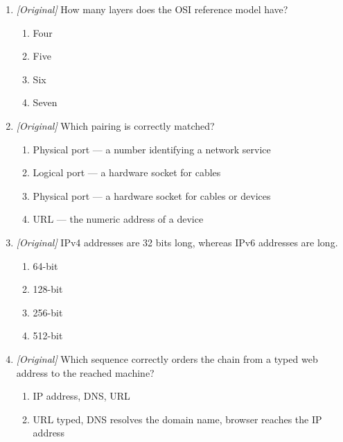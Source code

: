 \documentclass[11pt]{article}
\begin{document}
\begin{enumerate}[label=\textbf{Q\arabic*.}, leftmargin=*]
  \textbf{INCORRECT}?
  \begin{enumerate}[label=\Alph*.]
    \item IPv6 addresses are 128 bits long.
    \item A digital signature proves authenticity and integrity of a message.
    \item ICMP is used to transfer application data between hosts.
    \item BGP routes traffic between autonomous systems.
  \end{enumerate}
\item \textit{[Original]} How many layers does the OSI reference model have?
  \begin{enumerate}[label=\Alph*.]
    \item Four
    \item Five
    \item Six
    \item Seven
  \end{enumerate}
\item \textit{[Original]} Which pairing is correctly matched?
  \begin{enumerate}[label=\Alph*.]
    \item Physical port --- a number identifying a network service
    \item Logical port --- a hardware socket for cables
    \item Physical port --- a hardware socket for cables or devices
    \item URL --- the numeric address of a device
  \end{enumerate}
\item \textit{[Original]} IPv4 addresses are 32 bits long, whereas IPv6
  addresses are \underline{\hspace{2.2cm}} long.
  \begin{enumerate}[label=\Alph*.]
    \item 64-bit
    \item 128-bit
    \item 256-bit
    \item 512-bit
  \end{enumerate}
\item \textit{[Original]} Which sequence correctly orders the chain from a
  typed web address to the reached machine?
  \begin{enumerate}[label=\Alph*.]
    \item IP address, DNS, URL
    \item URL typed, DNS resolves the domain name, browser reaches the IP address

\end{enumerate}
\end{enumerate}
\end{document}
